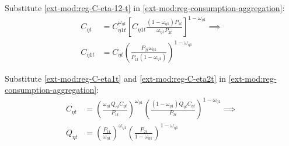 \documentclass[../thesis.tex]{subfiles}
\begin{document}
	Substitute \ref{ext-mod:reg-C-eta-12-t} in \ref{ext-mod:reg-consumption-aggregation}:
	\begin{align}
		C_{\eta t} &= C_{\eta 1 t}^{\omega_{\eta 1}} \left[ C_{\eta 1 t} \frac{(1 - \omega_{\eta 1}) P_{1t}}{\omega_{\eta 1} P_{2t}} \right]^{1-\omega_{\eta 1}} \implies \nonumber \\
		C_{\eta 1 t} &= C_{\eta t} \left( \frac{P_{2t} \omega_{\eta 1}}{P_{1t} (1 - \omega_{\eta 1})} \right)^{1-\omega_{\eta 1}} \label{ext-mod:reg-C-eta-1-t}
	\end{align}

	Substitute \ref{ext-mod:reg-C-eta1t} and \ref{ext-mod:reg-C-eta2t} in \ref{ext-mod:reg-consumption-aggregation}:
	\begin{align}
		C_{\eta t} &= \left( \frac{\omega_{\eta 1} Q_{\eta t} C_{\eta t}}{P_{1t}} \right)^{\omega_{\eta 1}} \left( \frac{(1 - \omega_{\eta 1}) Q_{\eta t} C_{\eta t}}{P_{2t}} \right)^{1-\omega_{\eta 1}} \implies \nonumber \\
		Q_{\eta t} &= \left( \frac{P_{1 t}}{\omega_{\eta 1}} \right)^{\omega_{\eta 1}} \left( \frac{P_{2 t}}{1 -\omega_{\eta 1}} \right)^{1 -\omega_{\eta 1}} \label{ext-mod:reg-total-expense-level}
	\end{align}

\begin{comment}
	
		Divide \ref{ext-mod:reg-total-expense-level} of region 1 by region 2:
	\begin{align}
		\frac{Q_{1t}}{Q_{2t}} &= \frac{\left( \frac{P_{1 t}}{\omega_{11}} \right)^{\omega_{11}} \left( \frac{P_{2 t}}{1 -\omega_{11}} \right)^{1 -\omega_{11}}}{\left( \frac{P_{1 t}}{\omega_{21}} \right)^{\omega_{21}} \left( \frac{P_{2 t}}{1 -\omega_{21}} \right)^{1 -\omega_{21}}} \implies \nonumber \\
		\frac{Q_{1t}}{Q_{2t}} &= \frac{\omega_{21}^{\omega_{21}} (1 -\omega_{21})^{1 -\omega_{21}}}{\omega_{11}^{\omega_{11}} (1 - \omega_{11})^{1 - \omega_{11}}} \label{ext-mod:reg-total-expense-level-2}
	\end{align}
	
\end{comment}

\end{document}
